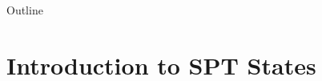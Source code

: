 \documentclass[xcolor=table, 11pt, aspectratio=169]{beamer}
\begin{document}
\begin{frame}{Outline}
      \tableofcontents
\end{frame}


\section{Introduction to SPT States}
\end{document}
